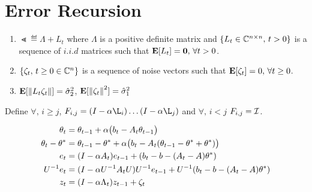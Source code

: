 \section{Error Recursion}
\begin{assumption}\label{cmplxassmp}
\begin{enumerate}[leftmargin=*, before=\leavevmode\vspace{-\baselineskip}]
\item $\Lt\eqdef \Lambda + L_t$ where $\Lambda$ is a positive definite matrix and $\{L_t \in \mathbb{C}^{n\times n},\,t> 0\}$ is a sequence of $i.i.d$ matrices such that $\mathbf{E}[L_t]=\mathbf{0},\,\forall t>0$.
\item $\{\zeta_t,\,t\geq 0\in \mathbb{C}^n\}$ is a sequence of noise vectors such that $\mathbf{E}[\zeta_t]=0,\,\forall t\geq 0$.
\item $\mathbf{E}[\left\| L_t \zeta_t\right\|]=\hat{\sigma}_2^2$, $\mathbf{E}[\left\| \zeta_t\right\|^2]=\hat{\sigma}_1^2$
\end{enumerate}
\end{assumption}

\begin{definition}
Define $\forall,\,i\geq j$, $F_{i,j}=(I-\alpha \L_i)\ldots (I-\alpha \L_j)$ and $\forall,\,i<j$ $F_{i,j}=\mathcal{I}$.
\end{definition}


\begin{align}
\theta_t&=\theta_{t-1}+\alpha\big(b_t-A_t\theta_{t-1}\big)\\
\theta_t-\theta^*&=\theta_{t-1}-\theta^*+\alpha\big(b_t-A_t(\theta_{t-1}-\theta^*+\theta^*)\big)\\
e_t&=(I-\alpha A_t)e_{t-1}+(b_t -b -(A_t-A)\theta^*)\\
U^{-1}e_t&=(I-\alpha U^{-1}A_t U) U^{-1}e_{t-1}+ U^{-1}(b_t -b -(A_t-A)\theta^*)\\
z_t&=(I-\alpha \Lambda_t) z_{t-1}+ \zeta_t
\end{align}


